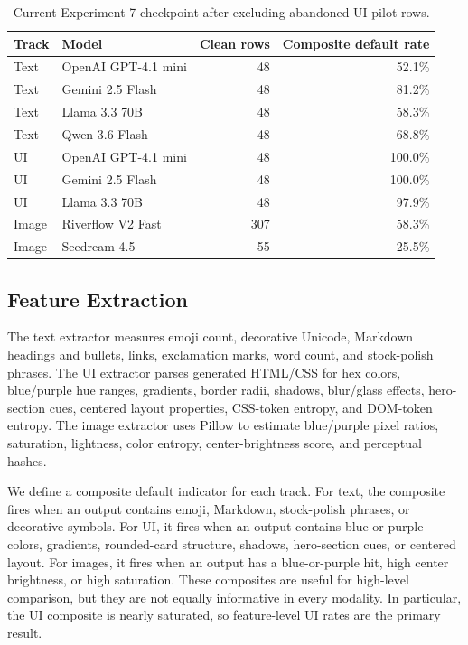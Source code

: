\documentclass[10pt]{article}
\begin{document}
\begin{table}[t]
\centering
\small
\caption{Current Experiment 7 checkpoint after excluding abandoned UI pilot rows.}
\label{tab:checkpoint}
\begin{tabular}{llrr}
\toprule
Track & Model & Clean rows & Composite default rate \\
\midrule
Text & OpenAI GPT-4.1 mini & 48 & 52.1\% \\
Text & Gemini 2.5 Flash & 48 & 81.2\% \\
Text & Llama 3.3 70B & 48 & 58.3\% \\
Text & Qwen 3.6 Flash & 48 & 68.8\% \\
UI & OpenAI GPT-4.1 mini & 48 & 100.0\% \\
UI & Gemini 2.5 Flash & 48 & 100.0\% \\
UI & Llama 3.3 70B & 48 & 97.9\% \\
Image & Riverflow V2 Fast & 307 & 58.3\% \\
Image & Seedream 4.5 & 55 & 25.5\% \\
\bottomrule
\end{tabular}
\end{table}

\subsection{Feature Extraction}

The text extractor measures emoji count, decorative Unicode, Markdown headings and bullets, links, exclamation marks, word count, and stock-polish phrases. The UI extractor parses generated HTML/CSS for hex colors, blue/purple hue ranges, gradients, border radii, shadows, blur/glass effects, hero-section cues, centered layout properties, CSS-token entropy, and DOM-token entropy. The image extractor uses Pillow to estimate blue/purple pixel ratios, saturation, lightness, color entropy, center-brightness score, and perceptual hashes.

We define a composite default indicator for each track. For text, the composite fires when an output contains emoji, Markdown, stock-polish phrases, or decorative symbols. For UI, it fires when an output contains blue-or-purple colors, gradients, rounded-card structure, shadows, hero-section cues, or centered layout. For images, it fires when an output has a blue-or-purple hit, high center brightness, or high saturation. These composites are useful for high-level comparison, but they are not equally informative in every modality. In particular, the UI composite is nearly saturated, so feature-level UI rates are the primary result.
\end{document}
